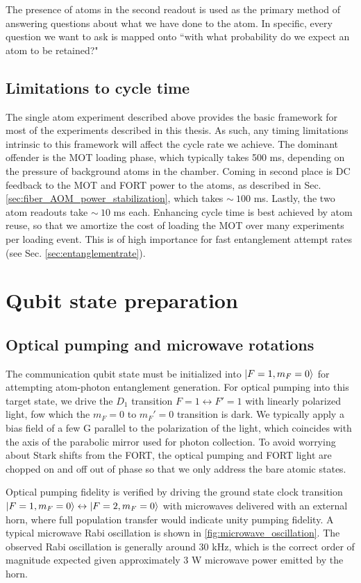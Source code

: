 The presence of atoms in the second readout is used as the primary method of answering questions about what we have done to the atom. In specific, every question we want to ask is mapped onto ``with what probability do we expect an atom to be retained?"

\subsection{Limitations to cycle time}
The single atom experiment described above provides the basic framework for most of the experiments described in this thesis. As such, any timing limitations intrinsic to this framework will affect the cycle rate we achieve. The dominant offender is the MOT loading phase, which typically takes 500 ms, depending on the pressure of background atoms in the chamber. Coming in second place is DC feedback to the MOT and FORT power to the atoms, as described in Sec. \ref{sec:fiber_AOM_power_stabilization}, which takes $\sim~100$ ms. Lastly, the two atom readouts take $\sim~10$ ms each. Enhancing cycle time is best achieved by atom reuse, so that we amortize the cost of loading the MOT over many experiments per loading event. This is of high importance for fast entanglement attempt rates (see Sec. \ref{sec:entanglementrate}).

\section{Qubit state preparation}

\subsection{Optical pumping and microwave rotations}
The communication qubit state must be initialized into $\ket{F=1,m_F=0}$ for attempting
atom-photon entanglement generation. For optical pumping into this target state, we drive the $D_1$ transition $F=1 \leftrightarrow F'=1$ with linearly polarized light, fow which the $m_F=0$ to $m_F'=0$ transition is dark. We typically apply a bias field of a few G parallel to the polarization of the light, which coincides with the axis of the parabolic mirror used for photon collection. To avoid worrying about Stark shifts from the FORT, the optical pumping and FORT light are chopped on and off out of phase so that we only address the bare atomic states. 

Optical pumping fidelity is verified by driving the ground state clock transition $\ket{F=1,m_F=0} \leftrightarrow \ket{F=2,m_F=0}$ with microwaves delivered with an external horn, where full population transfer would indicate unity pumping fidelity. A typical microwave Rabi oscillation is shown in \ref{fig:microwave_oscillation}. The observed Rabi oscillation is generally around 30 kHz, which is the correct order of magnitude expected given approximately 3 W microwave power emitted by the horn\cite{kwon2019rydberg}.


